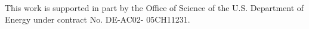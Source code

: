 This work is supported in part by the Office of Science of
the U.S. Department of Energy under contract No. DE-AC02-
05CH11231. 

